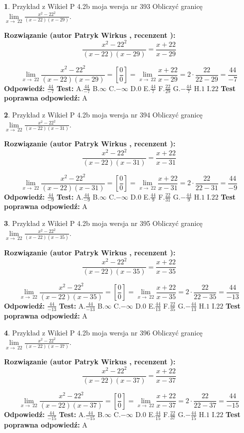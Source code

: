 \documentclass[12pt, a4paper]{article}
\theoremstyle{definition} %
\newtheorem{zad}{}
\newcommand{\zadStart}[1]{\begin{zad}#1\newline}
\newcommand{\zadStop}{\end{zad}}
\newcommand{\rozwStart}[2]{\noindent \textbf{Rozwiązanie (autor #1 , recenzent #2): }\newline}
\newcommand{\rozwStop}{\newline}
\newcommand{\odpStart}{\noindent \textbf{Odpowiedź:}\newline}
\newcommand{\odpStop}{\newline}
\newcommand{\testStart}{\noindent \textbf{Test:}\newline}
\newcommand{\testStop}{\newline}
\newcommand{\kluczStart}{\noindent \textbf{Test poprawna odpowiedź:}\newline}
\newcommand{\kluczStop}{\newline}
\begin{document}
\zadStart{Przykład z Wikieł P 4.2b moja wersja nr 393}
Obliczyć granicę $\lim\limits_{x\to\ 22}\frac{x^{2}-22^{2}}{(x-22)(x-29)}$.
\zadStop
\rozwStart{Patryk Wirkus}{}
$$\frac{x^{2}-22^{2}}{(x-22)(x-29)}=\frac{x+22}{x-29}$$

$$\lim\limits_{x\to\ 22}\frac{x^{2}-22^{2}}{(x-22)(x-29)}=[\frac{0}{0}]=\lim\limits_{x\to\ 22}\frac{x+22}{x-29}=2 \cdot \frac{22}{22-29} = \frac{44}{-7}$$
\rozwStop
\odpStart
$\frac{44}{-7}$
\odpStop
\testStart
A.$\frac{44}{-7}$
B.$\infty$
C.$-\infty$
D.$0$
E.$\frac{44}{7}$
F.$\frac{22}{29}$
G.$-\frac{44}{7}$
H.$1$
I.$22$
\testStop
\kluczStart
A
\kluczStop



\zadStart{Przykład z Wikieł P 4.2b moja wersja nr 394}
Obliczyć granicę $\lim\limits_{x\to\ 22}\frac{x^{2}-22^{2}}{(x-22)(x-31)}$.
\zadStop
\rozwStart{Patryk Wirkus}{}
$$\frac{x^{2}-22^{2}}{(x-22)(x-31)}=\frac{x+22}{x-31}$$

$$\lim\limits_{x\to\ 22}\frac{x^{2}-22^{2}}{(x-22)(x-31)}=[\frac{0}{0}]=\lim\limits_{x\to\ 22}\frac{x+22}{x-31}=2 \cdot \frac{22}{22-31} = \frac{44}{-9}$$
\rozwStop
\odpStart
$\frac{44}{-9}$
\odpStop
\testStart
A.$\frac{44}{-9}$
B.$\infty$
C.$-\infty$
D.$0$
E.$\frac{44}{9}$
F.$\frac{22}{31}$
G.$-\frac{44}{9}$
H.$1$
I.$22$
\testStop
\kluczStart
A
\kluczStop



\zadStart{Przykład z Wikieł P 4.2b moja wersja nr 395}
Obliczyć granicę $\lim\limits_{x\to\ 22}\frac{x^{2}-22^{2}}{(x-22)(x-35)}$.
\zadStop
\rozwStart{Patryk Wirkus}{}
$$\frac{x^{2}-22^{2}}{(x-22)(x-35)}=\frac{x+22}{x-35}$$

$$\lim\limits_{x\to\ 22}\frac{x^{2}-22^{2}}{(x-22)(x-35)}=[\frac{0}{0}]=\lim\limits_{x\to\ 22}\frac{x+22}{x-35}=2 \cdot \frac{22}{22-35} = \frac{44}{-13}$$
\rozwStop
\odpStart
$\frac{44}{-13}$
\odpStop
\testStart
A.$\frac{44}{-13}$
B.$\infty$
C.$-\infty$
D.$0$
E.$\frac{44}{13}$
F.$\frac{22}{35}$
G.$-\frac{44}{13}$
H.$1$
I.$22$
\testStop
\kluczStart
A
\kluczStop



\zadStart{Przykład z Wikieł P 4.2b moja wersja nr 396}
Obliczyć granicę $\lim\limits_{x\to\ 22}\frac{x^{2}-22^{2}}{(x-22)(x-37)}$.
\zadStop
\rozwStart{Patryk Wirkus}{}
$$\frac{x^{2}-22^{2}}{(x-22)(x-37)}=\frac{x+22}{x-37}$$

$$\lim\limits_{x\to\ 22}\frac{x^{2}-22^{2}}{(x-22)(x-37)}=[\frac{0}{0}]=\lim\limits_{x\to\ 22}\frac{x+22}{x-37}=2 \cdot \frac{22}{22-37} = \frac{44}{-15}$$
\rozwStop
\odpStart
$\frac{44}{-15}$
\odpStop
\testStart
A.$\frac{44}{-15}$
B.$\infty$
C.$-\infty$
D.$0$
E.$\frac{44}{15}$
F.$\frac{22}{37}$
G.$-\frac{44}{15}$
H.$1$
I.$22$
\testStop
\kluczStart
A
\kluczStop
\end{document}
